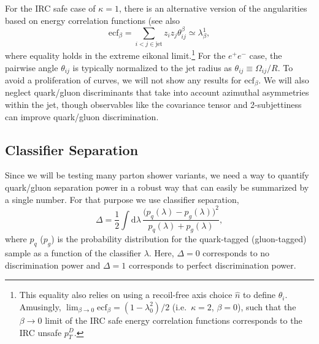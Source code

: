 \documentclass[11pt]{cernrep}
\begin{document}
For the IRC safe case of $\kappa = 1$, there is an alternative version
of the angularities based on energy correlation functions \cite{Larkoski:2013eya} (see also \cite{Banfi:2004yd,Jankowiak:2011qa}
\begin{equation}
\text{ecf}_\beta = \sum_{i < j \in \text{jet}} z_i z_j \theta_{ij}^\beta \simeq \lambda^{1}_{\beta},
\end{equation}
where equality holds in the extreme eikonal limit.\footnote{This equality also relies on using a recoil-free axis choice $\hat{n}$ to define $\theta_i$.  Amusingly, $\lim_{\beta \to 0} \text{ecf}_\beta = (1 - \lambda^{2}_{0})/2$ (i.e.~$\kappa = 2$, $\beta = 0$), such that the $\beta \to 0$ limit of the IRC safe energy correlation functions corresponds to the IRC unsafe $p_T^D$.}  For the $e^+ e^-$ case, the pairwise angle $\theta_{ij}$ is typically normalized to the jet radius as $\theta_{ij} \equiv \Omega_{ij}/R$.   To avoid a proliferation of curves, we will not show any results for $\text{ecf}_\beta$.  We will also neglect quark/gluon discriminants that take into account azimuthal asymmetries within the jet, though observables like the covariance tensor \cite{Gallicchio:2012ez} and 2-subjettiness \cite{Thaler:2010tr,Thaler:2011gf} can improve quark/gluon discrimination.

\subsection{Classifier Separation}
\label{quarkgluon_sec:classsep}

Since we will be testing many parton shower variants, we need a way to quantify quark/gluon separation power in a robust way that can easily be summarized by a single number.  For that purpose we use classifier separation,
\begin{equation}
\label{quarkgluon_eq:deltadef}
\Delta =  \frac{1}{2} \int \text{d} \lambda \, \frac{\bigl(p_q(\lambda) - p_g(\lambda)\bigr)^2}{p_q(\lambda) + p_g(\lambda)},
\end{equation}
where $p_q$ ($p_g$) is the probability distribution for the quark-tagged (gluon-tagged) sample as a function of the classifier $\lambda$.  Here, $\Delta = 0$ corresponds to no discrimination power and $\Delta = 1$ corresponds to perfect discrimination power.
\end{document}
